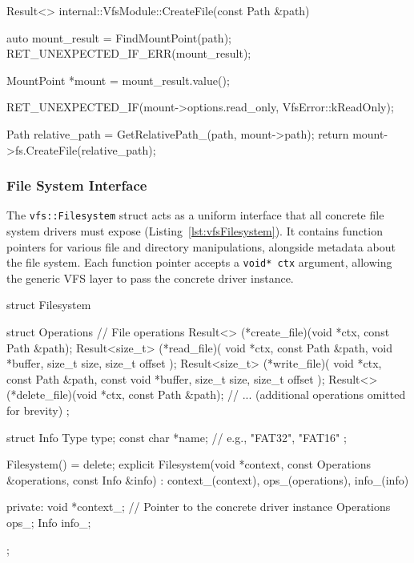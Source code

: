 \documentclass[a4paper,10pt,twoside]{report}
\theoremstyle{definition}
\begin{document}
\begin{cppcode}[caption={VfsModule CreateFile Implementation}, label={lst:vfsModuleCreateFile}]
Result<> internal::VfsModule::CreateFile(const Path &path)
{
    auto mount_result = FindMountPoint(path);
    RET_UNEXPECTED_IF_ERR(mount_result);

    MountPoint *mount = mount_result.value();

    RET_UNEXPECTED_IF(mount->options.read_only, VfsError::kReadOnly);

    Path relative_path = GetRelativePath_(path, mount->path);
    return mount->fs.CreateFile(relative_path);
}
\end{cppcode}

\clearpage

\subsubsection{File System Interface}

The \texttt{vfs::Filesystem} struct acts as a uniform interface that all concrete file system drivers must expose (Listing~\ref{lst:vfsFilesystem}). It contains function pointers for various file and directory manipulations, alongside metadata about the file system. Each function pointer accepts a \texttt{void* ctx} argument, allowing the generic VFS layer to pass the concrete driver instance.

\begin{cppcode}[caption={vfs::Filesystem Structure}, label={lst:vfsFilesystem}]
struct Filesystem {
    struct Operations {
        // File operations
        Result<> (*create_file)(void *ctx, const Path &path);
        Result<size_t> (*read_file)(
            void *ctx, const Path &path, void *buffer, size_t size, size_t offset
        );
        Result<size_t> (*write_file)(
            void *ctx, const Path &path, const void *buffer, size_t size, size_t offset
        );
        Result<> (*delete_file)(void *ctx, const Path &path);
        // ... (additional operations omitted for brevity)
    };

    struct Info {
        Type type;
        const char *name;  // e.g., "FAT32", "FAT16"
    };
    
    Filesystem() = delete;
    explicit Filesystem(void *context, const Operations &operations, const Info &info)
    : context_(context), ops_(operations), info_(info) {}

private:
    void *context_;  // Pointer to the concrete driver instance
    Operations ops_;
    Info info_;
};
\end{cppcode}
\end{document}
